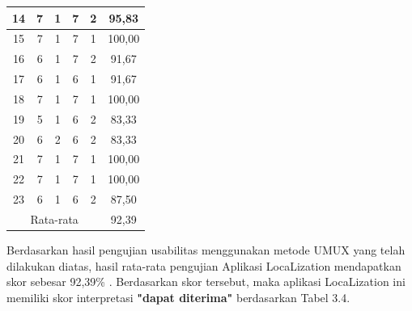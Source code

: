 \begin{table}[H]
\begin{tabular}{|ccccc|c|}
		\multicolumn{1}{|c|}{14}        & \multicolumn{1}{c|}{7}         & \multicolumn{1}{c|}{1} & \multicolumn{1}{c|}{7} & 2 & 95,83  \\ \hline
		\multicolumn{1}{|c|}{15}        & \multicolumn{1}{c|}{7}         & \multicolumn{1}{c|}{1} & \multicolumn{1}{c|}{7} & 1 & 100,00 \\ \hline
		\multicolumn{1}{|c|}{16}        & \multicolumn{1}{c|}{6}         & \multicolumn{1}{c|}{1} & \multicolumn{1}{c|}{7} & 2 & 91,67  \\ \hline
		\multicolumn{1}{|c|}{17}        & \multicolumn{1}{c|}{6}         & \multicolumn{1}{c|}{1} & \multicolumn{1}{c|}{6} & 1 & 91,67  \\ \hline
		\multicolumn{1}{|c|}{18}        & \multicolumn{1}{c|}{7}         & \multicolumn{1}{c|}{1} & \multicolumn{1}{c|}{7} & 1 & 100,00 \\ \hline
		\multicolumn{1}{|c|}{19}        & \multicolumn{1}{c|}{5}         & \multicolumn{1}{c|}{1} & \multicolumn{1}{c|}{6} & 2 & 83,33  \\ \hline
		\multicolumn{1}{|c|}{20}        & \multicolumn{1}{c|}{6}         & \multicolumn{1}{c|}{2} & \multicolumn{1}{c|}{6} & 2 & 83,33  \\ \hline
		\multicolumn{1}{|c|}{21}        & \multicolumn{1}{c|}{7}         & \multicolumn{1}{c|}{1} & \multicolumn{1}{c|}{7} & 1 & 100,00 \\ \hline
		\multicolumn{1}{|c|}{22}        & \multicolumn{1}{c|}{7}         & \multicolumn{1}{c|}{1} & \multicolumn{1}{c|}{7} & 1 & 100,00 \\ \hline
		\multicolumn{1}{|c|}{23}        & \multicolumn{1}{c|}{6}         & \multicolumn{1}{c|}{1} & \multicolumn{1}{c|}{6} & 2 & 87,50  \\ \hline
		\multicolumn{5}{|c|}{Rata-rata} & 92,39                                                                                         \\ \hline
	\end{tabular}
\end{table}


\par Berdasarkan hasil pengujian usabilitas menggunakan metode UMUX yang telah dilakukan diatas, hasil rata-rata pengujian Aplikasi LocaLization mendapatkan skor sebesar 92,39\% . Berdasarkan skor tersebut, maka aplikasi LocaLization ini memiliki skor interpretasi \textbf{"dapat diterima"} berdasarkan Tabel 3.4.

